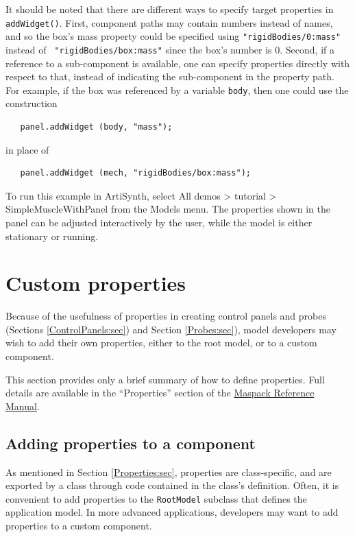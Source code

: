 \begin{sideblock}
It should be noted that there are different ways to specify target
properties in {\tt addWidget()}. First, component paths may contain
numbers instead of names, and so the box's mass property could be
specified using {\tt "rigidBodies/0:mass"} instead of {\tt
"rigidBodies/box:mass"} since the box's number is 0. Second, if a
reference to a sub-component is available, one can specify properties
directly with respect to that, instead of indicating the sub-component
in the property path. For example, if the box was referenced by a
variable {\tt body}, then one could use the construction
%
\begin{verbatim}
   panel.addWidget (body, "mass");
\end{verbatim}
%
in place of 
%
\begin{verbatim}
   panel.addWidget (mech, "rigidBodies/box:mass");
\end{verbatim}
%
\end{sideblock}

To run this example in ArtiSynth, select {\sf All demos > tutorial >
SimpleMuscleWithPanel} from the {\sf Models} menu. The properties 
shown in the panel can be adjusted interactively by the user,
while the model is either stationary or running.

\section{Custom properties}
\label{CustomProperties:sec}

Because of the usefulness of properties in creating control panels and
probes (Sections \ref{ControlPanels:sec}) and Section
\ref{Probes:sec}), model developers may wish to add their own
properties, either to the root model, or to a custom component.

This section provides only a brief summary of how to define
properties. Full details are available in the ``Properties'' section of
the \href{\artisynthDocBase/html/maspack/maspack.html}{
Maspack Reference Manual}.

\subsection{Adding properties to a component}

As mentioned in Section \ref{Properties:sec}, properties are
class-specific, and are exported by a class through code contained in
the class's definition.  Often, it is convenient to add properties to
the {\tt RootModel} subclass that defines the application model. In
more advanced applications, developers may want to add properties to a
custom component.

